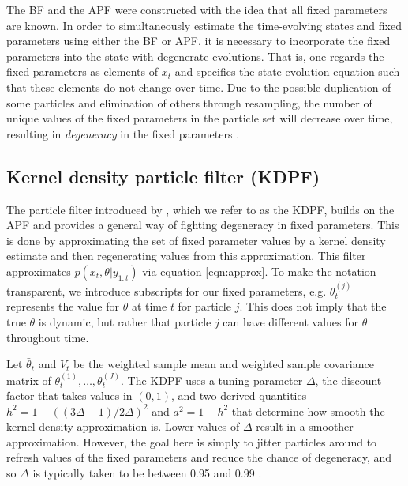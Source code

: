 The BF and the APF were constructed with the idea that all fixed parameters are known. In order to simultaneously estimate the time-evolving states and fixed parameters using either the BF or APF, it is necessary to incorporate the fixed parameters into the state with degenerate evolutions. That is, one regards the fixed parameters as elements of $x_t$ and specifies the state evolution equation such that these elements do not change over time. Due to the possible duplication of some particles and elimination of others through resampling, the number of unique values of the fixed parameters in the particle set will decrease over time, resulting in \emph{degeneracy} in the fixed parameters \citep{Liu:West:comb:2001}.

\subsection{Kernel density particle filter (KDPF) \label{sec:kd}}

The particle filter introduced by \citet{Liu:West:comb:2001}, which we refer to as the KDPF, builds on the APF and provides a general way of fighting degeneracy in fixed parameters. This is done by approximating the set of fixed parameter values by a kernel density estimate and then regenerating values from this approximation. This filter approximates $p(x_t,\theta| y_{1:t})$ via equation \eqref{eqn:approx}. To make the notation transparent, we introduce subscripts for our fixed parameters, e.g. $\theta_t^{(j)}$ represents the value for $\theta$ at time $t$ for particle $j$. This does not imply that the true $\theta$ is dynamic, but rather that particle $j$ can have different values for $\theta$ throughout time.

Let $\bar{\theta}_t$ and $V_t$ be the weighted sample mean and weighted sample covariance matrix of $\theta_t^{(1)},\ldots,\theta_t^{(J)}$.  The KDPF uses a tuning parameter $\Delta$, the discount factor that takes values in $(0,1)$, and two derived quantities $h^2 = 1 - ((3\Delta - 1)/2\Delta)^2$ and $a^2 = 1 - h^2$ that determine how smooth the kernel density approximation is. Lower values of $\Delta$ result in a smoother approximation. However, the goal here is simply to jitter particles around to refresh values of the fixed parameters and reduce the chance of degeneracy, and so $\Delta$ is typically taken to be between 0.95 and 0.99 \citep{Liu:West:comb:2001}.


